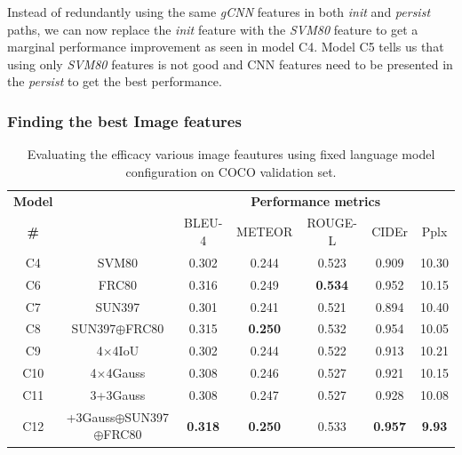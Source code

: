 Instead of redundantly using the same \emph{gCNN} features in both \emph{init} and
\emph{persist} paths, we can now replace the \emph{init} feature with the \emph{SVM80}
feature to get a marginal performance improvement as seen in model C4.
Model C5 tells us that using only \emph{SVM80} features is not good and CNN
features need to be presented in the \emph{persist} to get the best performance. 

\subsubsection{Finding the best Image features}
\begin{table}[htp]
  \centering
  \newcommand{\bs}{\small}
  \begin{adjustbox}{center}
  \begin{tabular}{|c|c|c|c|c|c|c|}
    \hline
    \bf Model & \bf \multirow{2}{*}{Init feature} & \multicolumn{5}{c|}{\bf Performance metrics}\\
    \cline{3-7}
    \bf \# &\bf &\bs BLEU-4 &\bs METEOR &\bs ROUGE-L &\bs CIDEr&\bs Pplx \\\hline
    C4 & SVM80               & 0.302 & 0.244 & 0.523 & 0.909 & 10.30  \\
    C6 & FRC80               & 0.316 & 0.249 &\bf0.534 & 0.952 & 10.15  \\
    C7 & SUN397              & 0.301 & 0.241 & 0.521 & 0.894 & 10.40  \\
    C8 & SUN397$\oplus$FRC80 & 0.315 &\bf0.250 & 0.532 &0.954 &10.05  \\\hline
    C9 & 4$\times$4IoU       & 0.302 & 0.244 & 0.522 & 0.913 & 10.21  \\
    C10 & 4$\times$4Gauss    & 0.308 & 0.246 & 0.527 & 0.921 & 10.15  \\
    C11 & 3+3Gauss           & 0.308 & 0.247 & 0.527 & 0.928 & 10.08  \\\hline
    C12 &\parbox[c][][c]{4cm}{\smallskip{}+3Gauss$\oplus$SUN397\\$\oplus$FRC80\smallskip} 
                             &\bf0.318&\bf0.250&0.533 &\bf0.957&\bf9.93\\\hline
  \end{tabular}
  \end{adjustbox}
  \caption{Evaluating the efficacy various image feautures using fixed language model
          configuration on COCO validation set.}
  \label{tab:resCocFeatExpt}
\end{table}

